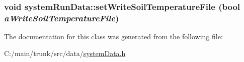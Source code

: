 \label{classsystem_run_data_ab7a375c89f501b059a04e5b2d2cbfb91}
\hypertarget{classsystem_run_data_afe0fbc78b02eb7f0b3a294ed936ebb43}{
\subsubsection[{setWriteSoilTemperatureFile}]{\setlength{\rightskip}{0pt plus 5cm}void systemRunData::setWriteSoilTemperatureFile (bool {\em aWriteSoilTemperatureFile})}}
\label{classsystem_run_data_afe0fbc78b02eb7f0b3a294ed936ebb43}


The documentation for this class was generated from the following file:\begin{DoxyCompactItemize}
\item 
C:/main/trunk/src/data/\hyperlink{system_data_8h}{systemData.h}\end{DoxyCompactItemize}
